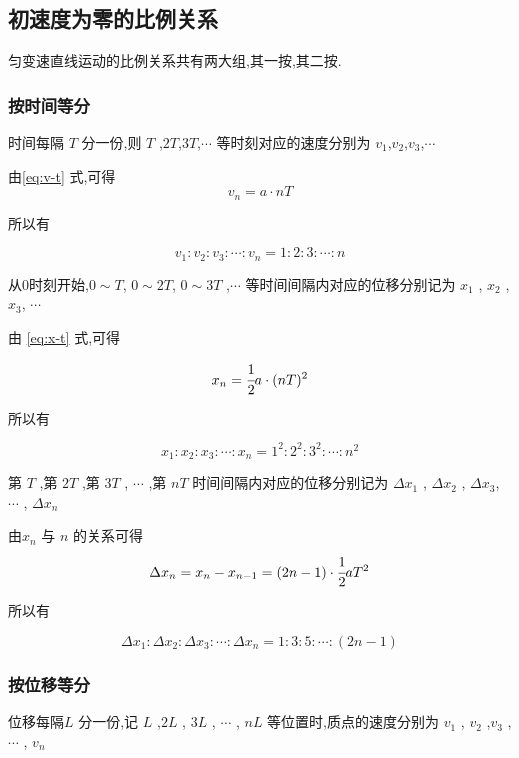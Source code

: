 \subsection{初速度为零的比例关系}

匀变速直线运动的比例关系共有两大组,其一按,其二按.

\subsubsection{按时间等分}

时间每隔 $T$ 分一份,则 $T$ ,$2T$,$3T$,$\cdots$ 等时刻对应的速度分别为 $v_1$,$v_2$,$v_3$,$\cdots$

由\eqref{eq:v-t} 式,可得
\[
  v_n=a\cdot nT
\]

所以有

\begin{equation}
  v_1 : v_2 :v_3 : \cdots : v_n = 1 : 2 : 3 :\cdots  : n 
  \label{eq:v-frac}
\end{equation}

从0时刻开始,$0\sim T$, $0\sim 2T$, $0\sim 3T $ ,$ \cdots$ 等时间间隔内对应的位移分别记为 $x_1$ , $x_2$ , $x_3$, $\cdots$

由 \eqref{eq:x-t} 式,可得

\[
  x_n=\cfrac{1}{2}a\cdot (nT)^2
\]

所以有

\begin{equation}
  x_1 : x_2 :x_3 : \cdots : x_n = 1^2 : 2^2 : 3^2 :\cdots  : n^2 
  \label{eq:x-frac}
\end{equation}

第 $T$ ,第 $2T$ ,第 $3T$ , $\cdots$ ,第 $nT$ 时间间隔内对应的位移分别记为
$\Delta x_1$ , $\Delta x_2$ , $\Delta x_3$, $\cdots$ , $\Delta x_n$

由$x_n$ 与 $n$ 的关系可得
\[
  \Delta x_n =x_n-x_{n-1}=(2n-1)\cdot \cfrac{1}{2}aT^2
\]

所以有

\begin{equation}
 \Delta x_1 :\Delta x_2 :\Delta x_3 : \cdots :\Delta x_n 
 = 1 : 3 : 5 :\cdots  : (2n-1)
  \label{eq:Delta x-frac}
\end{equation}

\subsubsection{按位移等分}

位移每隔$L$ 分一份,记 $L$ ,$2L$ , $3L$ , $\cdots $ , $nL$ 等位置时,质点的速度分别为 $v_1$ , $v_2$ ,$v_3$ , $\cdots$ , $v_n$ 

